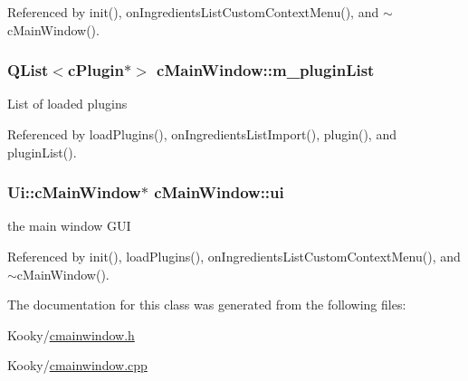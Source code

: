 Referenced by init(), on\+Ingredients\+List\+Custom\+Context\+Menu(), and $\sim$c\+Main\+Window().

\subsubsection[{\texorpdfstring{m\+\_\+plugin\+List}{m_pluginList}}]{\setlength{\rightskip}{0pt plus 5cm}Q\+List$<${\bf c\+Plugin}$\ast$$>$ c\+Main\+Window\+::m\+\_\+plugin\+List\hspace{0.3cm}{\ttfamily [private]}}\hypertarget{classc_main_window_ae3d9b84c671559f4ff864f89c7892216}{}\label{classc_main_window_ae3d9b84c671559f4ff864f89c7892216}
List of loaded plugins 

Referenced by load\+Plugins(), on\+Ingredients\+List\+Import(), plugin(), and plugin\+List().

\subsubsection[{\texorpdfstring{ui}{ui}}]{\setlength{\rightskip}{0pt plus 5cm}Ui\+::c\+Main\+Window$\ast$ c\+Main\+Window\+::ui\hspace{0.3cm}{\ttfamily [private]}}\hypertarget{classc_main_window_a03739e420b7f4f4d85f9c7a373050507}{}\label{classc_main_window_a03739e420b7f4f4d85f9c7a373050507}
the main window G\+UI 

Referenced by init(), load\+Plugins(), on\+Ingredients\+List\+Custom\+Context\+Menu(), and $\sim$c\+Main\+Window().



The documentation for this class was generated from the following files\+:\begin{DoxyCompactItemize}
\item 
Kooky/\hyperlink{cmainwindow_8h}{cmainwindow.\+h}\item 
Kooky/\hyperlink{cmainwindow_8cpp}{cmainwindow.\+cpp}\end{DoxyCompactItemize}
